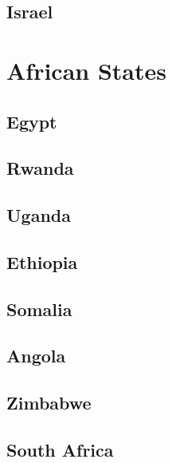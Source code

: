 \subsection*{Israel}

\section{African States}

\subsection*{Egypt}

\subsection*{Rwanda}

\subsection*{Uganda}

\subsection*{Ethiopia}

\subsection*{Somalia}

\subsection*{Angola}

\subsection*{Zimbabwe}

\subsection*{South Africa}
